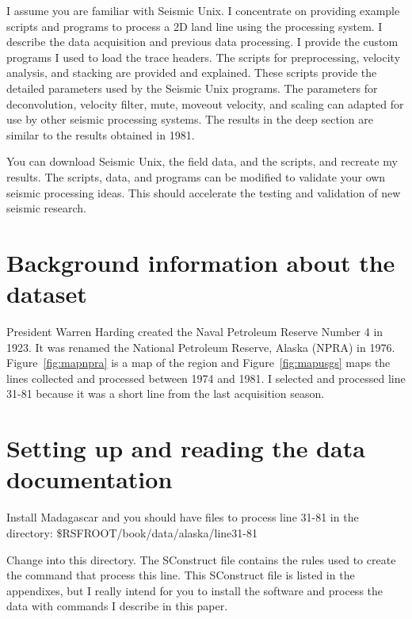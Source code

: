 I assume you are familiar with Seismic Unix.  I concentrate
on providing example scripts and programs to process a 2D land line
using the processing system. I describe the data acquisition and
previous data processing.  I provide the custom programs I used to
load the trace headers.  The scripts for preprocessing, velocity
analysis, and stacking are provided and explained.  These scripts
provide the detailed parameters used by the Seismic Unix programs.
The parameters for deconvolution, velocity filter, mute, moveout
velocity, and scaling can adapted for use by other seismic processing
systems. The results in the deep section are similar to the results 
obtained in 1981. 

You can download Seismic Unix, the field data, and the scripts, and 
recreate my results.  The scripts, data, and programs can be modified 
to validate your own seismic processing ideas.  This should accelerate 
the testing and validation of new seismic research.

\section{Background information about the dataset}

President Warren Harding created the Naval Petroleum Reserve Number 4
in 1923.  It was renamed the National Petroleum Reserve, Alaska (NPRA)
in 1976.  Figure~\ref{fig:mapnpra} is a map of the region and 
Figure~\ref{fig:mapusgs} maps the lines collected and processed between 1974
and 1981.  I selected and processed line 31-81 because it was a short
line from the last acquisition season.

\section{Setting up and reading the data documentation}
Install Madagascar and you should have files to process line 31-81 in 
the directory:
\$RSFROOT/book/data/alaska/line31-81

Change into this directory.  The SConstruct file contains the rules used 
to create the command that process this line.  This SConstruct file is 
listed in the appendixes, but I really intend for you to install the 
software and process the data with commands I describe in this paper.

